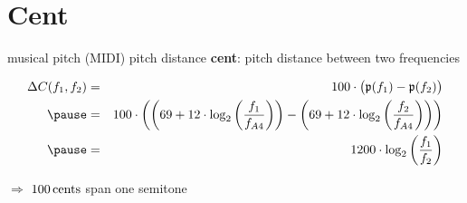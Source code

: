     \section{Cent}
        \begin{frame}{musical pitch}{  (MIDI) pitch distance}
                \textbf{cent}: pitch distance between two frequencies
                \begin{footnotesize}
                \begin{eqnarray*}\label{eq:cent}
                    \Delta C(f_1,f_2)	&=& 100\cdot\big(\mathfrak{p}(f_1) - \mathfrak{p}(f_2)\big)\\
                                        \pause
                                        &=& 100\cdot\left(\left(69 + 12\cdot\log_2\left(\frac{f_1}{f_{A4}}\right)\right) - \left(69 + 12\cdot\log_2\left(\frac{f_2}{f_{A4}}\right)\right)\right)\\
                                        \pause
                                        &=& 1200\cdot\log_2\left( \frac{f_1}{f_2} \right) 
                \end{eqnarray*}
                \end{footnotesize}
                \bigskip
                $\Rightarrow$ $\unit[100]{cents}$ span one semitone
        \end{frame}
        
